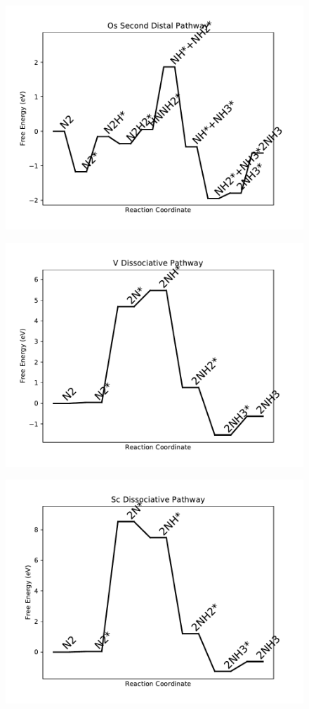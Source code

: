 \begin{figure}
\includegraphics[width=0.8\linewidth]{data/plots/Os_distal_2.pdf}
\end{figure}

\begin{figure}
\includegraphics[width=0.8\linewidth]{data/plots/V_dissociative.pdf}
\end{figure}

\begin{figure}
\includegraphics[width=0.8\linewidth]{data/plots/Sc_dissociative.pdf}
\end{figure}


